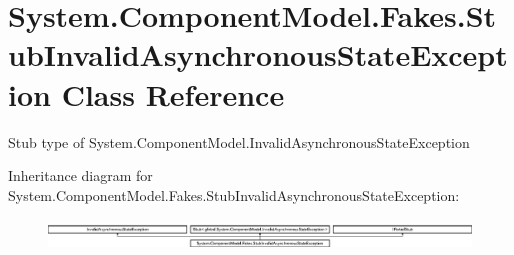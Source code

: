 \hypertarget{class_system_1_1_component_model_1_1_fakes_1_1_stub_invalid_asynchronous_state_exception}{\section{System.\-Component\-Model.\-Fakes.\-Stub\-Invalid\-Asynchronous\-State\-Exception Class Reference}
\label{class_system_1_1_component_model_1_1_fakes_1_1_stub_invalid_asynchronous_state_exception}
}


Stub type of System.\-Component\-Model.\-Invalid\-Asynchronous\-State\-Exception 


Inheritance diagram for System.\-Component\-Model.\-Fakes.\-Stub\-Invalid\-Asynchronous\-State\-Exception\-:\begin{figure}[H]
\begin{center}
\leavevmode
\includegraphics[height=0.815138cm]{class_system_1_1_component_model_1_1_fakes_1_1_stub_invalid_asynchronous_state_exception}
\end{center}
\end{figure}
